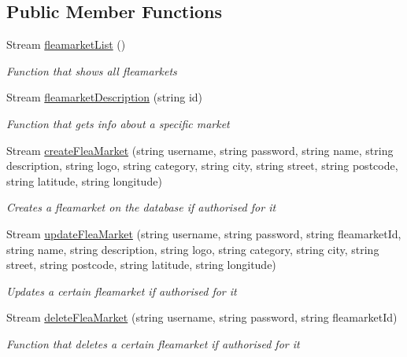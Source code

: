 \subsection*{Public Member Functions}
\begin{DoxyCompactItemize}
\item 
Stream \hyperlink{interface_service_library_1_1_i_rest_service_ad6d9e2dcc4d575310586390fa144d181}{fleamarket\-List} ()
\begin{DoxyCompactList}\small\item\em Function that shows all fleamarkets \end{DoxyCompactList}\item 
Stream \hyperlink{interface_service_library_1_1_i_rest_service_af1be4751f78a02a57e702a69054632cc}{fleamarket\-Description} (string id)
\begin{DoxyCompactList}\small\item\em Function that gets info about a specific market \end{DoxyCompactList}\item 
Stream \hyperlink{interface_service_library_1_1_i_rest_service_a54317be38e33419acaba46e8ba6a0958}{create\-Flea\-Market} (string username, string password, string name, string description, string logo, string category, string city, string street, string postcode, string latitude, string longitude)
\begin{DoxyCompactList}\small\item\em Creates a fleamarket on the database if authorised for it \end{DoxyCompactList}\item 
Stream \hyperlink{interface_service_library_1_1_i_rest_service_a6a7bcc09960ff24c5ce779e7be7d4ddb}{update\-Flea\-Market} (string username, string password, string fleamarket\-Id, string name, string description, string logo, string category, string city, string street, string postcode, string latitude, string longitude)
\begin{DoxyCompactList}\small\item\em Updates a certain fleamarket if authorised for it \end{DoxyCompactList}\item 
Stream \hyperlink{interface_service_library_1_1_i_rest_service_ab1f44acad37127065148c804d03fc36f}{delete\-Flea\-Market} (string username, string password, string fleamarket\-Id)
\begin{DoxyCompactList}\small\item\em Function that deletes a certain fleamarket if authorised for it \end{DoxyCompactList}\item 

\end{DoxyCompactItemize}
